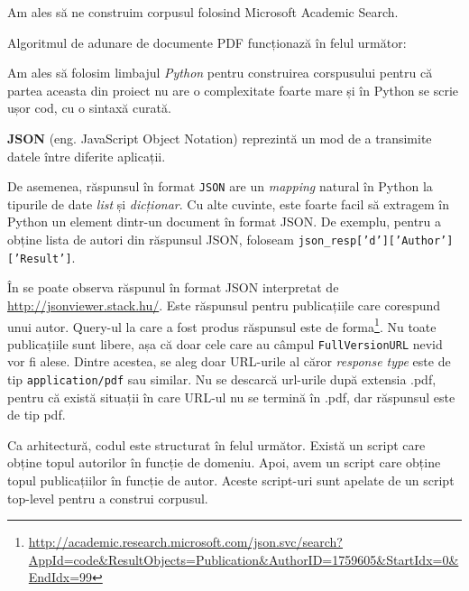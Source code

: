 \begin{description}
Am ales să ne construim corpusul folosind Microsoft Academic Search.


Algoritmul de adunare de documente PDF funcționază în felul următor:

\lstset{language=python}
\lstset{caption=Funcționarea downloader-ului pt MS Academic Search, label=lst:ms-academic-download}


Am ales să folosim limbajul \textit{Python} pentru construirea corspusului pentru că partea aceasta din proiect nu are o complexitate foarte mare și în Python se scrie ușor cod, cu o sintaxă curată.


\textbf{JSON} (eng. JavaScript Object Notation)  reprezintă un mod de a transimite datele între diferite aplicații.

De asemenea, răspunsul în format \texttt{JSON} are un \textit{mapping} natural în Python la tipurile de date \textit{list} și \textit{dicționar}. Cu alte cuvinte, este foarte facil să extragem în Python un element dintr-un document în format JSON. De exemplu, pentru a obține lista de autori din răspunsul JSON, foloseam \texttt{json\_resp['d']['Author']['Result']}.


În  se poate observa răspunul în format JSON interpretat de \url{http://jsonviewer.stack.hu/}. Este răspunsul pentru publicațiile care corespund unui autor. Query-ul la care a fost produs răspunsul este de forma\footnote{\url{http://academic.research.microsoft.com/json.svc/search?AppId=code&ResultObjects=Publication&AuthorID=1759605&StartIdx=0&EndIdx=99}}. Nu toate publicațiile sunt libere, așa că doar cele care au câmpul \texttt{FullVersionURL} nevid vor fi alese. Dintre acestea, se aleg doar URL-urile al căror \textit{response type} este de tip \texttt{application/pdf} sau similar. Nu se descarcă url-urile după extensia .pdf, pentru că există situații în care URL-ul nu se termină în .pdf, dar răspunsul este de tip pdf.

Ca arhitectură, codul este structurat în felul următor. Există un script care obține topul autorilor în funcție de domeniu. Apoi, avem un script care obține topul publicațiilor în funcție de autor. Aceste script-uri sunt apelate de un script top-level pentru a construi corpusul.

\end{description}

